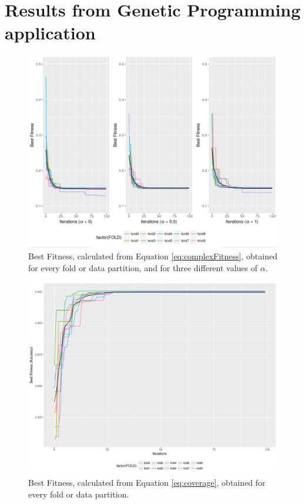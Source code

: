 \documentclass[a4paper,10pt,twocolumn,preprint,3p]{elsarticle}
\begin{document}

\section{Results from Genetic Programming application}
\label{sec:gp}

\begin{figure}[h!tb]
\centering
\includegraphics[width=\textwidth]{img/tree_ind_diff_alpha.pdf}
\caption{Best Fitness, calculated from Equation \ref{eq:complexFitness}, obtained for every fold or data partition, and for three different values of $\alpha$.}
\label{fig:tree_ind_diff_alpha}
\end{figure}

\begin{figure}[h!tb]
\centering
\includegraphics[width=\textwidth]{img/tree_ind_coverage.pdf}
\caption{Best Fitness, calculated from Equation \ref{eq:coverage}, obtained for every fold or data partition.}
\label{fig:tree_ind_coverage}
\end{figure}
\end{document}
